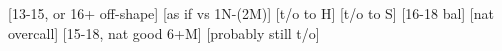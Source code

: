\begin{bidsemi}
[13-15, or 16+ off-shape]
    [as if vs 1N-(2M)]
[t/o to H]
[t/o to S]
[16-18 bal]
[nat overcall]
[15-18, nat good 6+M]
[probably still t/o]
\end{bidsemi}